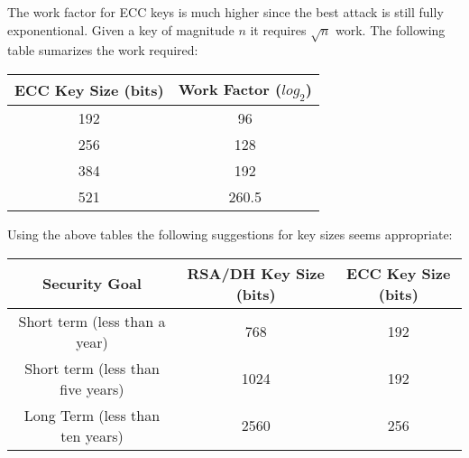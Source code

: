 \documentclass{book}
\begin{document}
The work factor for ECC keys is much higher since the best attack is still fully exponentional.  Given a key of magnitude
$n$ it requires $\sqrt n$ work.  The following table sumarizes the work required:
\begin{center}
\begin{tabular}{|c|c|}
    \hline ECC Key Size (bits) & Work Factor ($log_2$) \\
    \hline 192 & 96  \\
    \hline 256 & 128 \\
    \hline 384 & 192 \\
    \hline 521 & 260.5 \\
    \hline
\end{tabular}
\end{center}

Using the above tables the following suggestions for key sizes seems appropriate:
\begin{center}
\begin{tabular}{|c|c|c|}
    \hline Security Goal & RSA/DH Key Size (bits) & ECC Key Size (bits) \\
    \hline Short term (less than a year) & 768 & 192 \\
    \hline Short term (less than five years) & 1024 & 192 \\
    \hline Long Term (less than ten years) & 2560 & 256 \\
    \hline 
\end{tabular}
\end{center}
\end{document}
